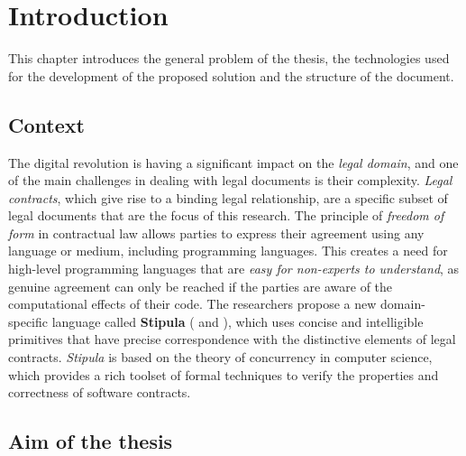 
\chapter{Introduction}
\label{cap:introduction}

This chapter introduces the general problem of the thesis, the technologies used for the development of 
the proposed solution and the structure of the document.


\section{Context}

The digital revolution is having a significant impact on the \textit{legal domain}, and one of the main 
challenges in dealing with legal documents is their complexity. \textit{Legal contracts}, which give rise 
to a binding legal relationship, are a specific subset of legal documents that are the focus of this 
research. The principle of \textit{freedom of form} in contractual law allows parties to express their 
agreement using any language or medium, including programming languages. This creates a need for high-level 
programming languages that are \textit{easy for non-experts to understand}, as genuine agreement can only 
be reached if the parties are aware of the computational effects of their code. The researchers propose a 
new domain-specific language called \textbf{Stipula} (\cite{article:stipula-dsl} and 
\cite{article:pacta-sunt-servanda}), which uses concise and intelligible primitives that have precise 
correspondence with the distinctive elements of legal contracts. \textit{Stipula} is based on the theory of 
concurrency in computer science, which provides a rich toolset of formal techniques to verify the 
properties and correctness of software contracts. 

\section{Aim of the thesis}

